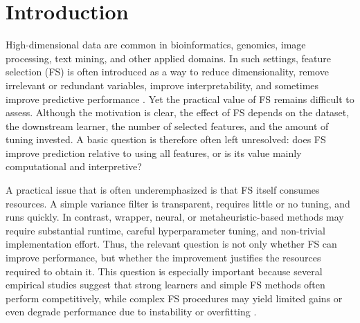 \documentclass[preprint,12pt,authoryear]{elsarticle}
\begin{document}
\begin{frontmatter}




\end{frontmatter}



\section{Introduction}
\label{chapter:intro}

High-dimensional data are common in bioinformatics, genomics, image processing, text mining, and other applied domains. In such settings, feature selection (FS) is often introduced as a way to reduce dimensionality, remove irrelevant or redundant variables, improve interpretability, and sometimes improve predictive performance \citep{bellman1957dynamic,donoho2000high,guyon2003introduction}. Yet the practical value of FS remains difficult to assess. Although the motivation is clear, the effect of FS depends on the dataset, the downstream learner, the number of selected features, and the amount of tuning invested. A basic question is therefore often left unresolved: does FS improve prediction relative to using all features, or is its value mainly computational and interpretive?

A practical issue that is often underemphasized is that FS itself consumes resources. A simple variance filter is transparent, requires little or no tuning, and runs quickly. In contrast, wrapper, neural, or metaheuristic-based methods may require substantial runtime, careful hyperparameter tuning, and non-trivial implementation effort. Thus, the relevant question is not only whether FS can improve performance, but whether the improvement justifies the resources required to obtain it. This question is especially important because several empirical studies suggest that strong learners and simple FS methods often perform competitively, while complex FS procedures may yield limited gains or even degrade performance due to instability or overfitting \citep{eklund2014choosing,nguyen2015unbiased,bommert2020benchmark,Grinsztajn22,zschaubitz2025benchmark}.
\end{document}

